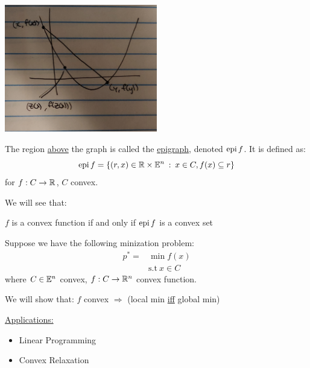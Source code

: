 \begin{example}
    ~\\
    \begin{minipage}{\textwidth}
        \centering
        \includegraphics[width=0.5\textwidth]{images/co463/lec1-convex-function}
    \end{minipage}
\end{example}

The region \underline{above} the graph is called the \underline{epigraph}, denoted $\operatorname{epi} f$.
It is defined as:
\begin{equation*}
    \operatorname{epi} f = \{ (r, x) \in \mathbb{R} \times \mathbb{E}^n\::\:x \in C, f(x) \subseteq r\}
\end{equation*}
for $f: C \rightarrow \mathbb{R}$, $C$ convex.

We will see that:
\begin{theorem}
    $f$ is a convex function if and only if $\operatorname{epi} f$ is a convex set
\end{theorem}

Suppose we have the following minization problem:
\begin{align*}
    p^* = &\min f(x) \\
    &\text{s.t} \ x \in C
\end{align*}
where $C \in \mathbb{E}^n$ convex, $f:C \rightarrow \mathbb{R}^n$ convex function.

We will show that: $f$ convex $\Rightarrow$ (local min \underline{iff} global min)

\underline{Applications:}

\begin{itemize}
    \item Linear Programming
    \item Convex Relaxation
\end{itemize}

\clearpage